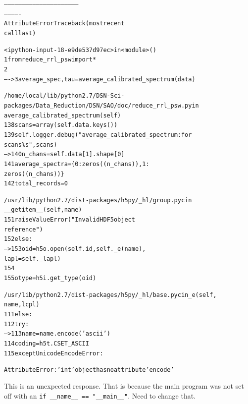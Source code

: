 \documentclass[letterpaper,10pt,english]{/usr/share/sphinx/texinputs/sphinxhowto}
\begin{document}
    

        
        

            
                
            \begin{alltt}

        --------------------------------------------------------------
-------------
    AttributeError                            Traceback (most recent
call last)



        <ipython-input-18-e9de537d97ec> in <module>()
          1 from reduce\_rrl\_psw import *
          2
    ----> 3 average\_spec, tau = average\_calibrated\_spectrum(data)




        /home/local/lib/python2.7/DSN-Sci-
packages/Data\_Reduction/DSN/SAO/doc/reduce\_rrl\_psw.py in
average\_calibrated\_spectrum(self)
        138     scans = array(self.data.keys())
        139     self.logger.debug("average\_calibrated\_spectrum: for
scans \%s", scans)
    --> 140     n\_chans = self.data[1].shape[0]
        141     average\_spectra = \{0: zeros((n\_chans)), 1:
zeros((n\_chans))\}
        142     total\_records = 0




        /usr/lib/python2.7/dist-packages/h5py/\_hl/group.pyc in
\_\_getitem\_\_(self, name)
        151                 raise ValueError("Invalid HDF5 object
reference")
        152         else:
    --> 153             oid = h5o.open(self.id, self.\_e(name),
lapl=self.\_lapl)
        154
        155         otype = h5i.get\_type(oid)




        /usr/lib/python2.7/dist-packages/h5py/\_hl/base.pyc in \_e(self,
name, lcpl)
        111         else:
        112             try:
    --> 113                 name = name.encode('ascii')
        114                 coding = h5t.CSET\_ASCII
        115             except UnicodeEncodeError:




        AttributeError: 'int' object has no attribute 'encode'

\end{alltt}
        
            
        
    
This is an unexpected response. That is because the main program was not
set off with an \texttt{if \_\_name\_\_ == "\_\_main\_\_"}. Need to
change that.
\end{document}
